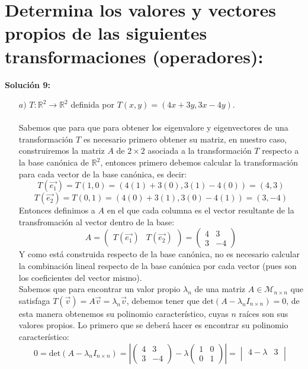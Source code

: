 \section{Determina los valores y vectores propios de las siguientes transformaciones (operadores):}
\textbf{Soluci\'on 9:}\\
\begin{itemize}
\item[$a)$] $T: \mathbb{R}^2 \rightarrow \mathbb{R}^2$ definida por $T(x, y) = (4x + 3y, 3x - 4y)$.\\\\
Sabemos que para que para obtener los eigenvalore y eigenvectores de una transformaci\'on $T$ es necesario primero obtener su matriz, en nuestro caso, construiremos la matriz $A$ de $2\times 2$ asociada a la transformaci\'on $T$ respecto a la base can\'onica de $\mathbb{R}^2$, entonces primero debemos calcular la transformaci\'on para cada vector de la base can\'onica, es decir:
\[T(\vec{e_1})=T(1,0)=(4(1)+3(0),3(1)-4(0))=(4,3)\]
\[T(\vec{e_2})=T(0,1)=(4(0)+3(1),3(0)-4(1))=(3,-4)\]
Entonces definimos a $A$ en el que cada columna es el vector resultante de la transfromaci\'on al vector dentro de la base:
\[A=\begin{pmatrix}T(\vec{e_1})&T(\vec{e_2})\end{pmatrix}=\begin{pmatrix}4&3\\
3&-4\end{pmatrix}\]
Y como est\'a construida respecto de la base can\'onica, no es necesario calcular la combinaci\'on lineal respecto de la base can\'onica por cada vector (pues son los coeficientes del vector mismo).\\
Sabemos que para encontrar un valor propio $\lambda_n$ de una matriz $A\in\mathcal{M}_{n\times n }$ que satisfaga $T(\vec{v})=A\vec{v}=\lambda_n\vec{v}$, debemos tener que $\text{det}(A-\lambda_nI_{n\times n })=0$, de esta manera obtenemos su polinomio caracter\'istico, cuyas $n$ ra\'ices son sus valores propios.
Lo primero que se deber\'a hacer es encontrar su polinomio caracter\'istico:
\[0=\text{det}(A-\lambda_nI_{n\times n })=\left|\begin{pmatrix}
4&3\\
3&-4
\end{pmatrix}-\lambda\begin{pmatrix}
1 &0\\0 &1
\end{pmatrix}\right|=\begin{vmatrix}4-\lambda &3\\

\end{vmatrix}\]
\end{itemize}
